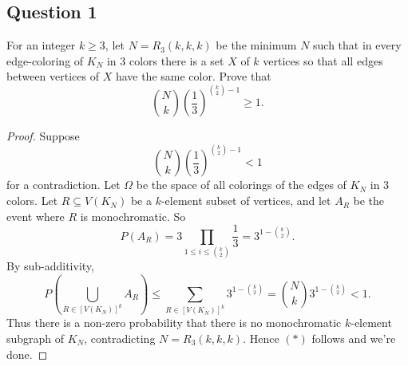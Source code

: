\subsection{Question 1}

For an integer \( k \geq 3 \), let \( N = R_{3}(k,k,k)  \) be the minimum \( N \) such that in every edge-coloring of \( K_{N}  \) in 3 colors there is a set \( X \) of \( k \) vertices so that all edges between vertices of \( X \) have the same color. Prove that \[ \binom{N}{k} \left ( \frac{1}{3}  \right ) ^{\binom{k}{2} - 1} \geq 1 \tag{$\ast$}. \]
\begin{proof}
	Suppose \[  \binom{N}{k} \left ( \frac{1}{3}  \right ) ^{\binom{k}{2} - 1} < 1 \] for a contradiction. Let \( \Omega \) be the space of all colorings of the edges of \( K_{N}  \) in 3 colors. Let \( R \subseteq V(K_{N} ) \) be a \( k \)-element subset of vertices, and let \( A_R \) be the event where \( R \) is monochromatic. So \[ P(A_{R}) = 3 \prod_{1 \leq i \leq \binom{k}{2} }^{} \frac{1}{3}  =  3^{1-\binom{k}{2} }. \] By sub-additivity, \[ P\left ( \bigcup_{R \in [V(K_{N})]^{k} }^{} A_{R}  \right ) \leq \sum_{R \in [V(K_{N})]^{k}}^{} 3^{1-\binom{k}{2}} = \binom{N}{k} 3^{1 - \binom{k}{2} } < 1.  \] Thus there is a non-zero probability that there is no monochromatic \( k \)-element subgraph of \( K_{N}  \), contradicting \( N = R_{3} (k,k,k) \). Hence \((\ast)\) follows and we're done.
\end{proof}
